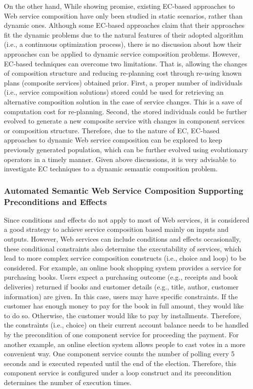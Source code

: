 On the other hand, While showing promise, existing EC-based approaches to Web service composition have only been studied in static scenarios, rather than dynamic ones. Although some EC-based approaches \cite{feng2013dynamic,liu2005dynamic} claim that their approaches fit the dynamic problems due to the natural features of their adopted algorithm (i.e., a continuous optimization process), there is no discussion about how their approaches can be applied to dynamic service composition problems. However, EC-based techniques can overcome two limitations. That is, allowing the changes of composition structure and reducing re-planning cost through re-using known plans (composite services) obtained prior. First, a proper number of individuals (i.e., service composition solutions) stored could be used for retrieving an alternative composition solution in the case of service changes. This is a save of computation cost for re-planning. Second, the stored individuals could be further evolved to generate a new composite service with changes in component services or composition structure. Therefore, due to the nature of EC, EC-based approaches to dynamic Web service composition can be explored to keep previously generated population, which can be further evolved using evolutionary operators in a timely manner. Given above discussions, it is very advisable to investigate EC techniques to a dynamic semantic composition problem.


\subsubsection{Automated Semantic Web Service Composition Supporting Preconditions and Effects}

Since conditions and effects do not apply to most of Web services, it is considered a good strategy to achieve service composition based mainly on inputs and outputs. However, Web services can include conditions and effects occasionally, these conditional constraints also determine the executability of services, which lead to more complex service composition constructs (i.e., choice and loop) to be considered. For example, an online book shopping system \cite{wang2014automated} provides a service for purchasing books. Users expect a purchasing outcome (e.g., receipts and book deliveries) returned if books and customer details (e.g., title, author, customer information) are given. In this case, users may have specific constraints. If the customer has enough money to pay for the book in full amount, they would like to do so. Otherwise, the customer would like to pay by installments. Therefore, the constraints (i.e., choice) on their current account balance needs to be handled by the   precondition of one component service for proceeding the payment. For another example, an online election system allows people to cast votes in a more convenient way. One component service counts the number of polling every 5 seconds and is executed repeated until the end of the election. Therefore, this component service is configured under a loop construct and its precondition determines the number of execution times.


